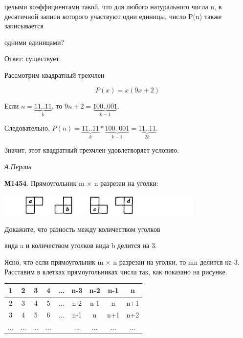\begin{multicols}{2}
целыми коэффициентами такой, что для любого натурального числа n, в десятичной записи которого участвуют одни единицы, число P(n) также записывается

одними единицами? 

Ответ: существует.

Рассмотрим квадратный трехчлен

$$P(x) = x(9x + 2)$$

Если $n=\underbrace{11..11}_{k}$, то $9n + 2 = \underbrace{100..001}_{k-1}$.

Следовательно, $P(n) = \underbrace{11..11}_{k} *\underbrace{100..001}_{k-1}= \underbrace{11..11}_{2k}$.

Значит, этот квадратный трехчлен удовлетворяет условию.

\textit{А.Перлин}

\vspace { 3mm }

\textbf{М1454}. Прямоугольник m × n разрезан на уголки:

\includegraphics {2} 

Докажите, что разность между количеством уголков

вида a и количеством уголков вида b делится на 3.

\vspace { 3mm }

Ясно, что если прямоугольник m × n разрезан на уголки, то mn делится на 3. Расставим в клетках прямоугольниках числа так, как показано на рисунке.

\begin{center}

\addtolength{\tabcolsep}{-2pt}

\begin{tabular}{|c|c|c|c|c|c|c|c|c|}

\hline

1 & 2 & 3 & 4 & ... & n-3 & n-2 & n-1 & n \\

\hline

2 & 3 & 4 & 5 & ... & n-2 & n-1 & n & n+1 \\

\hline

3 & 4 & 5 & 6 & ... & n-1 & n & n+1 & n+2 \\

\hline

... & ... & ... & ... & & ... & ... & ... & ... \\


\end{tabular}
\end{center}
\end{multicols}
